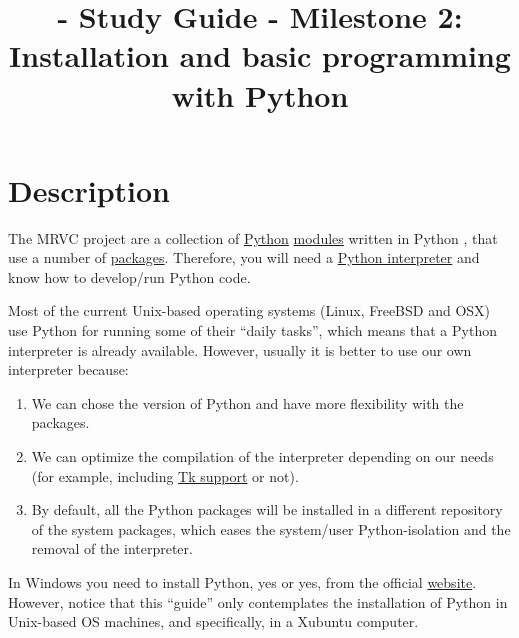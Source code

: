 
\title{\SM{} - Study Guide - Milestone 2: Installation and basic programming with Python}

\maketitle

\tableofcontents

\section{Description}

The MRVC project \cite{MRVC} are a collection of
\href{https://www.python.org/}{Python}
\href{https://docs.python.org/3/tutorial/modules.html#modules}{modules}
written in Python \cite{python}, that use a number of
\href{https://docs.python.org/3/tutorial/modules.html#packages}{packages}. Therefore,
you will need a
\href{https://docs.python.org/3/tutorial/interpreter.html}{Python
  interpreter} and know how to develop/run Python code.

Most of the current Unix-based operating systems (Linux, FreeBSD and
OSX) use Python for running some of their ``daily tasks'', which means
that a Python interpreter is already available. However, usually it is
better to use our own interpreter because:

\begin{enumerate}

\item We can chose the version of Python and have more flexibility
  with the packages.

\item We can optimize the compilation of the interpreter depending on
  our needs (for example, including
  \href{https://wiki.python.org/moin/TkInter}{Tk support} or not).

\item By default, all the Python packages will be installed in a
  different repository of the system packages, which eases the
  system/user Python-isolation and the removal of the interpreter.

\end{enumerate}

In Windows you need to install Python, yes or yes, from the official
\href{https://www.python.org/downloads/}{website}. However, notice
that this ``guide'' only contemplates the installation of Python in
Unix-based OS machines, and specifically, in a Xubuntu computer.

